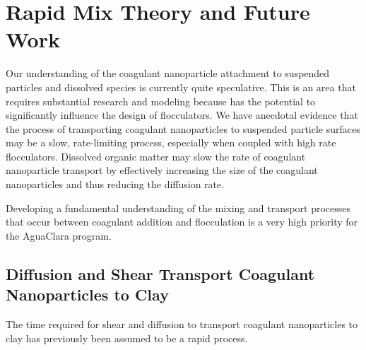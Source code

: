 \documentclass[letterpaper,10pt,english]{sphinxmanual}
\begin{document}
%
\begin{sphinxVerbatim}[commandchars=\\\{\}]
    
      
  
\end{sphinxVerbatim}


\chapter{Rapid Mix Theory and Future Work}
\label{\detokenize{Rapid_Mix/RM_Theory_and_Future_Work:rapid-mix-theory-and-future-work}}\label{\detokenize{Rapid_Mix/RM_Theory_and_Future_Work:title-rapid-mix-theory-and-future-work}}\label{\detokenize{Rapid_Mix/RM_Theory_and_Future_Work::doc}}
Our understanding of the coagulant nanoparticle attachment to suspended particles and dissolved species is currently quite speculative. This is an area that requires substantial research and modeling because has the potential to significantly influence the design of flocculators. We have anecdotal evidence that the process of transporting coagulant nanoparticles to suspended particle surfaces may be a slow, rate-limiting process, especially when coupled with high rate flocculators. Dissolved organic matter may slow the rate of coagulant nanoparticle transport by effectively increasing the size of the coagulant nanoparticles and thus reducing the diffusion rate.

Developing a fundamental understanding of the mixing and transport processes that occur between coagulant addition and flocculation is a very high priority for the AguaClara program.


\section{Diffusion and Shear Transport Coagulant Nanoparticles to Clay}
\label{\detokenize{Rapid_Mix/RM_Theory_and_Future_Work:diffusion-and-shear-transport-coagulant-nanoparticles-to-clay}}\label{\detokenize{Rapid_Mix/RM_Theory_and_Future_Work:heading-diffusion-and-shear-transport-coagulant-nanoparticles-to-clay}}
The time required for shear and diffusion to transport coagulant nanoparticles to clay has previously been assumed to be a rapid process.
\end{document}
